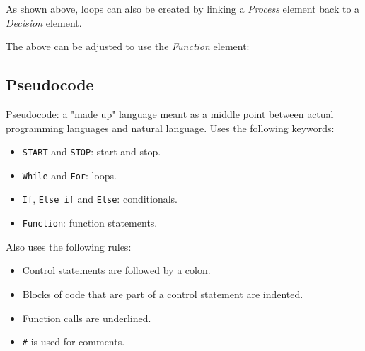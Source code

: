 \documentclass[a4paper]{report}
\begin{document}
As shown above, loops can also be created by linking a \textit{Process}
element back to a \textit{Decision} element.

The above can be adjusted to use the \textit{Function} element:

\begin{figure}[h]
	\centering
\end{figure}

\subsection{Pseudocode}

Pseudocode: a "made up" language meant as a middle point between actual
programming languages and natural language. Uses the following keywords:

\begin{itemize}
	\item{\texttt{START} and \texttt{STOP}: start and stop.}
	\item{\texttt{While} and \texttt{For}: loops.}
	\item{\texttt{If}, \texttt{Else if} and \texttt{Else}: conditionals.}
	\item{\texttt{Function}: function statements.}
\end{itemize}

Also uses the following rules:

\begin{itemize}
	\item{Control statements are followed by a colon.}
	\item{Blocks of code that are part of a control statement are
		indented.}
	\item{Function calls are underlined.}
	\item{\texttt{\textit{\#}} is used for comments.}
\end{itemize}
\end{document}
